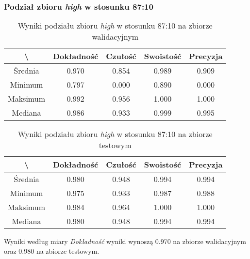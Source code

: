\subsubsection{Podział zbioru \textit{high} w stosunku 87:10}


\begin{table}[H]
	\centering
	\caption{Wyniki podziału zbioru \textit{high} w stosunku 87:10 na zbiorze walidacyjnym}
	\vspace{6pt}
	{\footnotesize
		\begin{tabular}{|c|c|c|c|c|}
      \hline \textbackslash & Dokładność & Czułość & Swoistość & Precyzja \\
      \hline Średnia & 0.970 & 0.854 & 0.989 & 0.909 \\
      \hline Minimum & 0.797 & 0.000 & 0.890 & 0.000 \\
      \hline Maksimum & 0.992 & 0.956 & 1.000 & 1.000 \\
      \hline Mediana & 0.986 & 0.933 & 0.999 & 0.995 \\
      \hline
    \end{tabular}
    \label{Tab:highsplitb_val}
	}
	\vspace{0pt}
\end{table}

\begin{table}[H]
	\centering
	\caption{Wyniki podziału zbioru \textit{high} w stosunku 87:10 na zbiorze testowym}
	\vspace{6pt}
	{\footnotesize
		\begin{tabular}{|c|c|c|c|c|}
      \hline \textbackslash & Dokładność & Czułość & Swoistość & Precyzja \\
      \hline Średnia & 0.980 & 0.948 & 0.994 & 0.994 \\
      \hline Minimum & 0.975 & 0.933 & 0.987 & 0.988 \\
      \hline Maksimum & 0.984 & 0.964 & 1.000 & 1.000 \\
      \hline Mediana & 0.980 & 0.948 & 0.994 & 0.994 \\
      \hline
    \end{tabular}
    \label{Tab:highsplitb_test}
	}
	\vspace{0pt}
\end{table}

Wyniki według miary \textit{Dokładność} wyniki wynoszą 0.970 na zbiorze walidacyjnym oraz 0.980 na zbiorze testowym.
